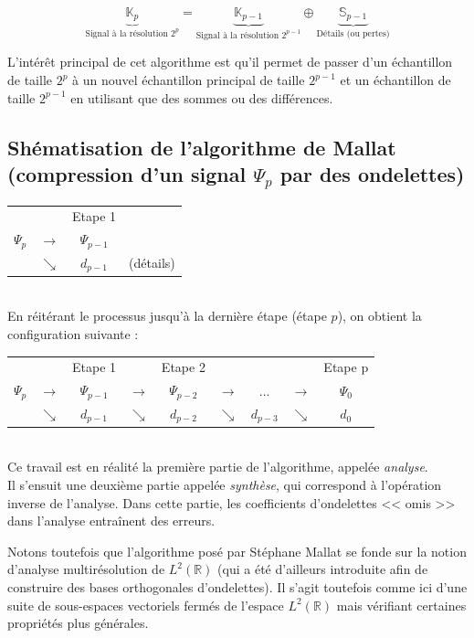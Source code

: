 \documentclass{article}
\begin{document}
$$ \underbrace{\mathbb{K}_p}_{\text{Signal à la résolution } 2^p}
= \underbrace{\mathbb{K}_{p-1}}_{\text{Signal à la résolution } 2^{p-1}} \oplus 
\underbrace{\mathbb{S}_{p-1}}_\text{Détails (ou pertes)} $$

L’intérêt principal de cet algorithme est qu’il permet de passer d’un échantillon de taille $2^p$ à un nouvel échantillon principal de taille $2^{p-1}$ et un échantillon de taille $2^{p-1}$ en utilisant que des sommes ou des différences.


\subsection{Shématisation de l'algorithme de Mallat (compression d'un signal $\Psi{}_{p}$ par des ondelettes)} 

\begin{tabular}{cccc}
           &             & Etape 1      & \\
$\Psi{}_{p}$ & $\rightarrow$ & $\Psi{}_{p-1}$ & \\
           & $\searrow$    & $d_{p-1}$      & (détails)
\end{tabular} \\

En réitérant le processus jusqu’à la dernière étape (étape $p$), on obtient la configuration suivante : \\


\begin{tabular}{ccccccccc}
           &             & Etape 1      & 			  & Etape 2     & & & & Etape p \\
$ \Psi{}_{p}$ & $ \rightarrow$ & $ \Psi{}_{p-1}$ & $ \rightarrow$ & $ \Psi{}_{p-2}$ & $ \rightarrow$ & ... & $ \rightarrow$ & $ \Psi{}_0$ \\
           & $ \searrow$    & $ d_{p-1} $      & $ \searrow$    & $ d_{p-2} $ 
& $ \searrow $ & $ d_{p-3 }$ & $ \searrow $ & $ d_0 $
\end{tabular} \\

Ce travail est en réalité la première partie de l’algorithme, appelée \textit{analyse}. \\

Il s’ensuit une deuxième partie appelée \textit{synthèse}, qui correspond à l’opération inverse de l’analyse. Dans cette partie, les coefficients d’ondelettes << omis >> dans l’analyse entraînent des erreurs.

Notons toutefois que l’algorithme posé par Stéphane Mallat se fonde sur la notion d’analyse multirésolution de $L^2 (\mathbb{R})$ (qui a été d’ailleurs introduite afin de construire des bases orthogonales d’ondelettes). Il s’agit toutefois comme ici d’une suite de sous-espaces vectoriels fermés de l’espace $L^2 (\mathbb{R})$ mais vérifiant certaines propriétés plus générales.
\end{document}

